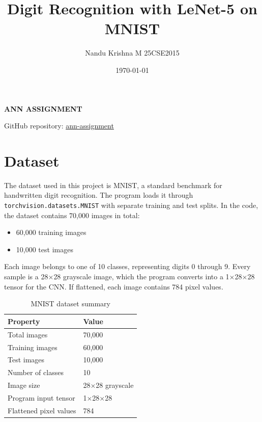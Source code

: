 \documentclass[11pt,a4paper]{article}
\title{Digit Recognition with LeNet-5 on MNIST}
\author{Nandu Krishna M 25CSE2015}
\date{\today}
\begin{document}
\begin{center}
{\Huge\bfseries ANN ASSIGNMENT\par}
\vspace{0.25em}
{\Large \thetitle\par}
\vspace{0.35em}
{\normalsize \theauthor\par}
{\normalsize GitHub repository: \href{https://github.com/TheGhossst/ann-assignment}{ann-assignment}\par}
\vspace{0.15em}
{\normalsize \thedate\par}
\end{center}
\vspace{-0.75em}

\section{Dataset}
The dataset used in this project is MNIST, a standard benchmark for handwritten digit recognition. The program loads it through \texttt{torchvision.datasets.MNIST} with separate training and test splits. In the code, the dataset contains 70,000 images in total:
\begin{itemize}[leftmargin=*]
  \item 60,000 training images
  \item 10,000 test images
\end{itemize}
Each image belongs to one of 10 classes, representing digits 0 through 9. Every sample is a 28$\times$28 grayscale image, which the program converts into a 1$\times$28$\times$28 tensor for the CNN. If flattened, each image contains 784 pixel values.

\begin{table}[h]
\centering
\caption{MNIST dataset summary}
\begin{tabular}{ll}
\toprule
Property & Value \\
\midrule
Total images & 70,000 \\
Training images & 60,000 \\
Test images & 10,000 \\
Number of classes & 10 \\
Image size & 28$\times$28 grayscale \\
Program input tensor & 1$\times$28$\times$28 \\
Flattened pixel values & 784 \\
\bottomrule
\end{tabular}
\end{table}
\end{document}
